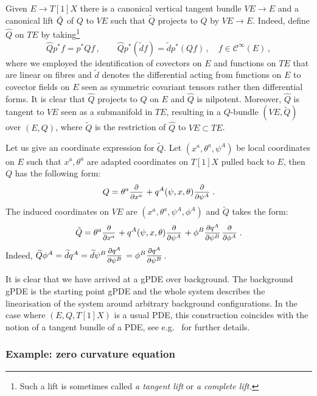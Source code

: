 \documentclass[a4paper,12pt]{article}
\numberwithin{equation}{section} %
\renewcommand{\tilde}{\widetilde}
\renewcommand{\hat}{\widehat}
\renewcommand{\d}{\partial}
\newcommand{\ffrac}[2]{\raisebox{.5pt}%
  {\footnotesize$\displaystyle\frac{#1}{#2}$}\kern1pt}
\newcommand{\ddl}[2]{\ffrac{\d #1}{\d #2}}
\newcommand{\cC}{\mathcal{C}}
\begin{document}
Given $E \to T[1]X$ there is a canonical vertical tangent bundle $VE \rightarrow E$ and a canonical lift $\Tilde{Q}$ of $Q$ to $VE$ such that $\tilde Q$ projects to $Q$ by $VE \to E$. Indeed, define $\hat Q$ on $TE$ by taking\footnote{Such a lift is sometimes called \textit{a tangent lift} or \textit{a complete lift.}}
\begin{equation}
\hat Q p^* f=p^* Q f\,,\qquad  \hat Q p^*(\tilde d f)= \tilde d p^*(Q f)\,, \quad f \in \cC^\infty(E)\,,
\end{equation}
where we employed the identification of covectors on $E$ and functions on $TE$ that are linear on fibres and $\tilde d$ denotes the differential acting from functions on $E$ to covector fields on $E$ seen as symmetric covariant tensors rather then differential forms. It is clear that $\hat Q$ projects to $Q$ on $E$ and $\hat Q$ is nilpotent. Moreover, $\hat Q$ is tangent to $VE$ seen as a submanifold in $TE$, resulting in a $Q$-bundle $(VE,\tilde Q)$ over $(E,Q)$, where $\tilde Q$ is the restriction of $\hat Q$ to $VE \subset TE$.


Let us give an coordinate expression for $\tilde Q$. Let  $(x^a, \theta^a, \psi^A)$ be local coordinates on $E$ such that $x^a,\theta^a$ are adapted coordinates on $T[1]X$ pulled back to $E$, then $Q$ has the following form:
\begin{equation}
    Q = \theta^a \ddl{}{x^a} + q^A(\psi,x,\theta)\ddl{}{\psi^A}\,.
\end{equation}
The induced coordinates on $VE$ are $(x^a, \theta^a, \psi^A, \phi^A)$ and $\tilde Q$ takes the form:
\begin{equation}
    \Tilde{Q} = \theta^a \ddl{}{x^a} + q^A(\psi,x,\theta)\ddl{}{\psi^A} + \phi^B \ddl{q^A}{\psi^B}\ddl{}{\phi^A}\,.
\end{equation}
Indeed, $\tilde Q \phi^A=\tilde dq^A=\tilde d\psi^B\ddl{q^A}{\psi^B}=\phi^B\ddl{q^A}{\psi^B}$. 

It is clear that we have arrived at a gPDE over background. The background gPDE is the starting point gPDE and the whole system describes the linearisation of the system around arbitrary background configurations. In the case where $(E,Q,T[1]X)$ is a usual PDE, this construction coincides with the notion of a tangent bundle of a PDE, see e.g.~\cite{Krasil'shchik:2010ij} for further details. 

\subsubsection{Example: zero curvature equation}
    
\end{document}
